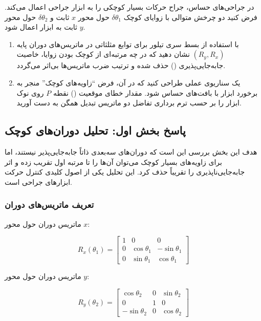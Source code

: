 \documentclass{article}
\begin{document}
در جراحی‌های حساس، جراح حرکات بسیار کوچکی را به ابزار جراحی اعمال می‌کند. فرض کنید دو چرخش متوالی با زوایای کوچک $\delta\theta_1$ حول محور $x$ ثابت و $\delta\theta_2$ حول محور $y$ ثابت به ابزار اعمال شود.

\begin{enumerate}
	\item با استفاده از بسط سری تیلور برای توابع مثلثاتی در ماتریس‌های دوران پایه $(R_y , R_x)$ نشان دهید که در چه مرتبه‌ای از کوچک بودن زوایا، خاصیت جابه‌جایی‌پذیری () حذف شده و ترتیب ضرب ماتریس‌ها بی‌اثر می‌گردد.
	
	\item یک سناریوی عملی طراحی کنید که در آن، فرض ``زاویه‌های کوچک'' منجر به برخورد ابزار با بافت‌های حساس شود. مقدار خطای موقعیت () نقطه $P$ روی نوک ابزار را بر حسب ترم برداری تفاضل دو ماتریس تبدیل همگن 
	 به دست آورید.
\end{enumerate}

\subsection{پاسخ بخش اول: تحلیل دوران‌های کوچک}

هدف این بخش بررسی این است که دوران‌های سه‌بعدی ذاتاً جابه‌جایی‌پذیر نیستند، اما برای زاویه‌های بسیار کوچک می‌توان آن‌ها را تا مرتبه اول تقریب زده و اثر جابه‌جایی‌ناپذیری را تقریباً حذف کرد. این تحلیل یکی از اصول کلیدی کنترل حرکت ابزارهای جراحی است.

\subsubsection{تعریف ماتریس‌های دوران}

ماتریس دوران حول محور $x$:

\[
R_x(\theta_1)=
\begin{bmatrix}
	1 & 0 & 0\\
	0 & \cos\theta_1 & -\sin\theta_1\\
	0 & \sin\theta_1 & \cos\theta_1
\end{bmatrix}
\]

ماتریس دوران حول محور $y$:

\[
R_y(\theta_2)=
\begin{bmatrix}
	\cos\theta_2 & 0 & \sin\theta_2\\
	0 & 1 & 0\\
	-\sin\theta_2 & 0 & \cos\theta_2
\end{bmatrix}
\]
\end{document}
